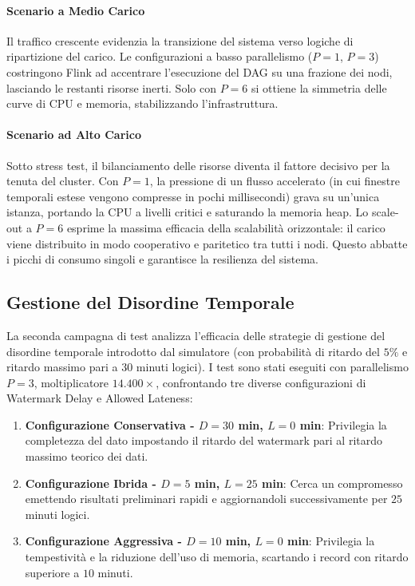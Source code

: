 \documentclass[conference]{IEEEtran}
\begin{document}
\paragraph{Scenario a Medio Carico}
Il traffico crescente evidenzia la transizione del sistema verso logiche di ripartizione del carico. Le configurazioni a basso parallelismo ($P=1$, $P=3$) costringono Flink ad accentrare l'esecuzione del DAG su una frazione dei nodi, lasciando le restanti risorse inerti. Solo con $P=6$ si ottiene la simmetria delle curve di CPU e memoria, stabilizzando l'infrastruttura.

\paragraph{Scenario ad Alto Carico}
Sotto stress test, il bilanciamento delle risorse diventa il fattore decisivo per la tenuta del cluster. Con $P=1$, la pressione di un flusso accelerato (in cui finestre temporali estese vengono compresse in pochi millisecondi) grava su un'unica istanza, portando la CPU a livelli critici e saturando la memoria heap. Lo scale-out a $P=6$ esprime la massima efficacia della scalabilità orizzontale: il carico viene distribuito in modo cooperativo e paritetico tra tutti i nodi. Questo abbatte i picchi di consumo singoli e garantisce la resilienza del sistema.

\subsection{Gestione del Disordine Temporale}\label{subsec:perf_out_of_order}

La seconda campagna di test analizza l'efficacia delle strategie di gestione del disordine temporale introdotto dal simulatore (con probabilità di ritardo del $5\%$ e ritardo massimo pari a $30$ minuti logici). I test sono stati eseguiti con parallelismo $P=3$, moltiplicatore $14.400\times$, confrontando tre diverse configurazioni di Watermark Delay e Allowed Lateness:
\begin{enumerate}
    \item \textbf{Configurazione Conservativa - $D=30$ min, $L=0$ min}: Privilegia la completezza del dato impostando il ritardo del watermark pari al ritardo massimo teorico dei dati.
    \item \textbf{Configurazione Ibrida - $D=5$ min, $L=25$ min}: Cerca un compromesso emettendo risultati preliminari rapidi e aggiornandoli successivamente per $25$ minuti logici.
    \item \textbf{Configurazione Aggressiva - $D=10$ min, $L=0$ min}: Privilegia la tempestività e la riduzione dell'uso di memoria, scartando i record con ritardo superiore a $10$ minuti.
\end{enumerate}
\end{document}
